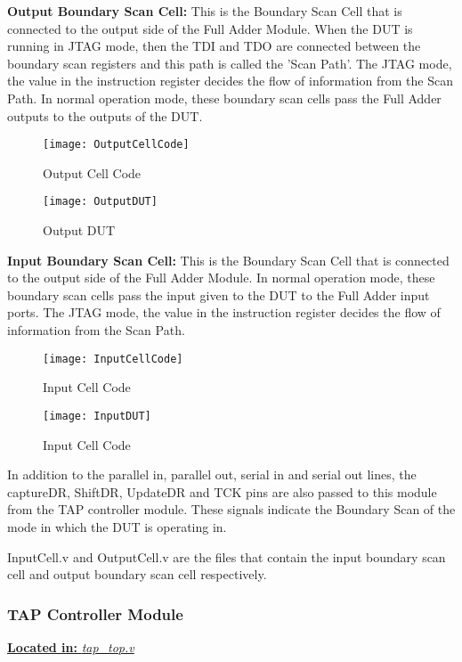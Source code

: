 \documentclass[a4paper,11pt]{article}
\begin{document}
\textbf{Output Boundary Scan Cell:}
This is the Boundary Scan Cell that is connected to the output side of the Full Adder Module. When the DUT is running in JTAG mode, then the TDI and TDO are connected between the boundary scan registers and this path is called the 'Scan Path'. The JTAG mode, the value in the instruction register decides the flow of information from the Scan Path. In normal operation mode, these boundary scan cells pass the Full Adder outputs to the outputs of the DUT.

\begin{figure}[ht]
\centering
\texttt{[image: OutputCellCode]}
\caption{Output Cell Code}
\end{figure}

\begin{figure}[ht]
\centering
\texttt{[image: OutputDUT]}
\caption{Output DUT}
\end{figure}

\FloatBarrier
\textbf{Input Boundary Scan Cell:}
This is the Boundary Scan Cell that is connected to the output side of the Full Adder Module. In normal operation mode, these boundary scan cells pass the input given to the DUT to the Full Adder input ports. The JTAG mode, the value in the instruction register decides the flow of information from the Scan Path.

\begin{figure}[ht]
\centering
\texttt{[image: InputCellCode]}
\caption{Input Cell Code}
\end{figure}

\begin{figure}[ht]
\centering
\texttt{[image: InputDUT]}
\caption{Input Cell Code}
\end{figure}

In addition to the parallel in, parallel out, serial in and serial out lines, the captureDR, ShiftDR, UpdateDR and TCK pins are also passed to this module from the TAP controller module. These signals indicate the Boundary Scan of the mode in which the DUT is operating in.

InputCell.v and OutputCell.v are the files that contain the input boundary scan cell and output boundary scan cell respectively.


\FloatBarrier
\subsubsection{TAP Controller Module}
\underline{\textbf{Located in:} \textit{tap\_top.v}}\\
\end{document}
